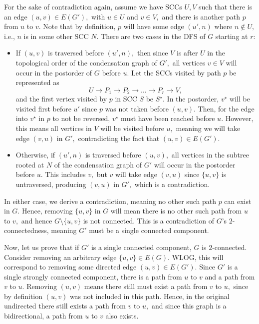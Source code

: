 \documentclass[12pt]{article}
\begin{document}
\begin{enumerate}
\begin{enumerate}
        For the sake of contradiction again, assume we have SCCs $U,
        V$ such that there is an edge $(u, v) \in E(G'),$ with $u \in
        U$ and $v \in V,$ and there is another path $p$ from $u$ to
        $v.$ Note that by definition, $p$ will have some edge $(u',
        n)$ where $n \not \in U,$ i.e., $n$ is in some other SCC $N$.
        There are two cases in the DFS of $G$ starting at $r$:
        \begin{itemize}
          \item If $(u, v)$ is traversed before $(u', n),$ then since
            $V$ is after $U$ in the topological order of the
            condensation graph of $G',$ all vertices $v \in V$ will
            occur in the postorder of $G$ before $u.$ Let the SCCs
            visited by path $p$ be represented as
            $$
            U \to P_1 \to P_2\to \ldots  \to P_r \to   V,
            $$
            and the first vertex visited by $p$ in SCC $S$ be
            $S^\star.$ In the postorder, $v^\star$ will be visited
            first before $u'$ since $p$ was not taken before $(u,
            v).$ Then, for the edge into $v^\star$ in $p$ to not be
            reversed, $v^\star$ must have been reached before $u.$
            However, this means all vertices in $V$ will be visited
            before $u, $ meaning we will take edge $(v, u)$ in $G',$
            contradicting the fact that $(u, v) \in E(G').$

          \item Otherwise, if $(u', n)$ is traversed before $(u, v),$
            all vertices in the subtree rooted at $N$ of the
            condensation graph of $G'$ will occur in the postorder
            before $u.$ This includes $v,$ but $v$ will take edge
            $(v, u)$ since $\{u, v\}$ is untraversed, producing $(v,
            u)$ in $G',$ which is a contradiction.
        \end{itemize}

        In either case, we derive a contradiction, meaning no other
        such path $p$ can exist in $G.$ Hence, removing $\{u, v\}$ in
        $G$ will mean there is no other such path from $u$ to $v,$
        and hence $G \setminus \{u, v\}$ is not connected. This is a
        contradiction of $G$'s $2$-connectedness, meaning $G'$ must
        be a single connected component.

        Now, let us prove that if $G'$ is a single connected
        component, $G$ is $2$-connected. Consider removing an
        arbitrary edge $\{u, v\} \in E(G).$ WLOG, this will
        correspond to removing some directed edge $(u, v) \in E(G').$
        Since $G'$ is a single strongly connected component, there is
        a path from $u$ to $v$ and a path from $v$ to $u.$ Removing
        $(u, v)$ means there still must exist a path from $v$ to $u,$
        since by definition $(u, v)$ was not included in this path.
        Hence, in the original undirected there still exists a path
        from $v$ to $u,$ and since this graph is a bidirectional, a
        path from $u$ to $v$ also exists.


\end{enumerate}
\end{enumerate}
\end{document}
